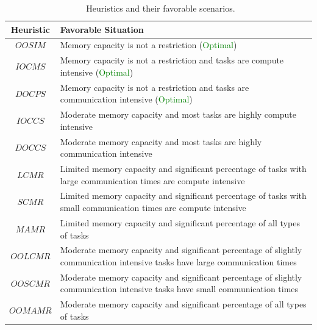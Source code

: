 \documentclass[sigconf]{acmart}
\begin{document}
{		\begin{table}[!h]
			\begin{center}
			\begin{tabular}{|c|p{6.5cm}|}
				\hline
				\textbf{Heuristic} & \textbf{\hspace{2cm}Favorable Situation} \\ \hline
				$OOSIM$ & Memory capacity is not a restriction (\textcolor{green}{Optimal}) \\ \hline
				$IOCMS$ & Memory capacity is not a restriction and tasks are compute intensive (\textcolor{green}{Optimal}) \\ \hline
				$DOCPS$ & Memory capacity is not a restriction and tasks are communication intensive (\textcolor{green}{Optimal}) \\ \hline
				$IOCCS$ & Moderate memory capacity and most tasks are highly compute intensive \\ \hline
				$DOCCS$ & Moderate memory capacity and most tasks are highly communication intensive \\ \hline
				$LCMR$ & Limited memory capacity and significant percentage of tasks with large communication times are compute intensive\\ \hline
				$SCMR$ & Limited memory capacity and significant percentage of tasks with small communication times are compute intensive\\ \hline
				$MAMR$ & Limited memory capacity and significant percentage of all types of tasks\\ \hline
				$OOLCMR$ & Moderate memory capacity and significant percentage of slightly communication intensive tasks have large communication times\\ \hline
				$OOSCMR$ & Moderate memory capacity and significant percentage of slightly communication intensive tasks have small communication times\\ \hline
				$OOMAMR$ & Moderate memory capacity and significant percentage of all types of tasks \\ \hline
			\end{tabular}\caption{~\label{tab:heuristicsAndFavorableScenarios}Heuristics and their favorable scenarios.\vspace*{-0.75cm}}
			\end{center}
		\end{table}

	
		
}
\end{document}

